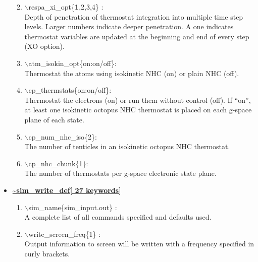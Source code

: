 \begin{itemize}
\begin{enumerate}
 \vspace{0.15in}\Large
 \item   $\backslash$respa\_xi\_opt\{{\bf 1},2,3,4\} : \\
 \large
   Depth of penetration of thermostat integration into multiple time step
   levels.  Larger numbers indicate deeper penetration.  A one indicates
   thermostat variables are updated at the beginning and end of 
   every step (XO option).

 \vspace{0.15in}\Large
 \item   $\backslash$atm\_isokin\_opt\{on:on/off\}: \\ \large
    Thermostat the atoms using isokinetic NHC (on) or plain NHC (off).

 \vspace{0.15in}\Large
 \item   $\backslash$cp\_thermstats\{on:on/off\}: \\ \large
    Thermostat the electrons (on) or run them without control (off).
    If ``on'', at least one isokinetic octopus NHC thermostat is placed on each
    g-space plane of each state.

 \vspace{0.15in}\Large
 \item   $\backslash$cp\_num\_nhc\_iso\{2\}: \\ \large
    The number of tenticles in an isokinetic octopus NHC thermostat.

 \vspace{0.15in}\Large
 \item   $\backslash$cp\_nhc\_chunk\{1\}: \\ \large
    The number of thermostats per g-space electronic state plane.
\end{enumerate}

\clearpage
\huge
\item[] \underline{\bf \~{}sim\_write\_def[ 27 keywords]}
\begin{enumerate}

 \vspace{0.15in} \Large
 \item   $\backslash$sim\_name\{sim\_input.out\} : \\
    A complete list of all commands specified and defaults used.

 \vspace{0.15in} \Large
 \item   $\backslash$write\_screen\_freq\{1\} : \\
  \large
   Output information to screen will be written with a frequency specified
   in curly brackets.


\end{enumerate}
\end{itemize}
